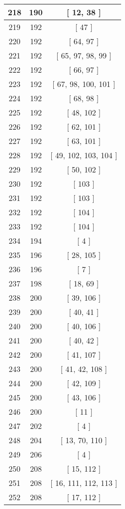 \begin{center}
\begin{longtable}[H]{|| c c c ||}
\hline
218 & 190 & [ 12, 38 ] \\ 
\hline
219 & 192 & [ 47 ] \\ 
\hline
220 & 192 & [ 64, 97 ] \\ 
\hline
221 & 192 & [ 65, 97, 98, 99 ] \\ 
\hline
222 & 192 & [ 66, 97 ] \\ 
\hline
223 & 192 & [ 67, 98, 100, 101 ] \\ 
\hline
224 & 192 & [ 68, 98 ] \\ 
\hline
225 & 192 & [ 48, 102 ] \\ 
\hline
226 & 192 & [ 62, 101 ] \\ 
\hline
227 & 192 & [ 63, 101 ] \\ 
\hline
228 & 192 & [ 49, 102, 103, 104 ] \\ 
\hline
229 & 192 & [ 50, 102 ] \\ 
\hline
230 & 192 & [ 103 ] \\ 
\hline
231 & 192 & [ 103 ] \\ 
\hline
232 & 192 & [ 104 ] \\ 
\hline
233 & 192 & [ 104 ] \\ 
\hline
234 & 194 & [ 4 ] \\ 
\hline
235 & 196 & [ 28, 105 ] \\ 
\hline
236 & 196 & [ 7 ] \\ 
\hline
237 & 198 & [ 18, 69 ] \\ 
\hline
238 & 200 & [ 39, 106 ] \\ 
\hline
239 & 200 & [ 40, 41 ] \\ 
\hline
240 & 200 & [ 40, 106 ] \\ 
\hline
241 & 200 & [ 40, 42 ] \\ 
\hline
242 & 200 & [ 41, 107 ] \\ 
\hline
243 & 200 & [ 41, 42, 108 ] \\ 
\hline
244 & 200 & [ 42, 109 ] \\ 
\hline
245 & 200 & [ 43, 106 ] \\ 
\hline
246 & 200 & [ 11 ] \\ 
\hline
247 & 202 & [ 4 ] \\ 
\hline
248 & 204 & [ 13, 70, 110 ] \\ 
\hline
249 & 206 & [ 4 ] \\ 
\hline
250 & 208 & [ 15, 112 ] \\ 
\hline
251 & 208 & [ 16, 111, 112, 113 ] \\ 
\hline
252 & 208 & [ 17, 112 ] \\ 

\end{longtable}
\end{center}
